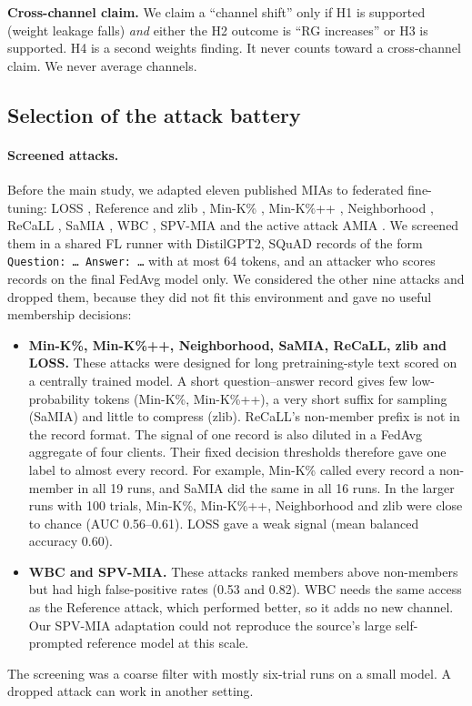 \documentclass[11pt]{article}
\begin{document}
\textbf{Cross-channel claim.} We claim a ``channel shift'' only if H1 is supported (weight leakage falls) \emph{and} either the H2 outcome is ``RG increases'' or H3 is supported. H4 is a second weights finding. It never counts toward a cross-channel claim. We never average channels.

\subsection{Selection of the attack battery}\label{sec:battery}

\paragraph{Screened attacks.} Before the main study, we adapted eleven published MIAs to federated fine-tuning: LOSS \citep{yeom2018privacy}, Reference and zlib \citep{carlini2021extracting}, Min-K\% \citep{shi2024detecting}, Min-K\%++ \citep{zhang2025minkpp}, Neighborhood \citep{mattern2023membership}, ReCaLL \citep{xie2024recall}, SaMIA \citep{kaneko2024sampling}, WBC \citep{chen2026window}, SPV-MIA \citep{fu2024membership} and the active attack AMIA \citep{nguyen2023active}. We screened them in a shared FL runner with DistilGPT2, SQuAD records of the form \texttt{Question: \ldots{} Answer: \ldots} with at most 64 tokens, and an attacker who scores records on the final FedAvg model only. We considered the other nine attacks and dropped them, because they did not fit this environment and gave no useful membership decisions:
\begin{itemize}
  \item \textbf{Min-K\%, Min-K\%++, Neighborhood, SaMIA, ReCaLL, zlib and LOSS.} These attacks were designed for long pretraining-style text scored on a centrally trained model. A short question--answer record gives few low-probability tokens (Min-K\%, Min-K\%++), a very short suffix for sampling (SaMIA) and little to compress (zlib). ReCaLL's non-member prefix is not in the record format. The signal of one record is also diluted in a FedAvg aggregate of four clients. Their fixed decision thresholds therefore gave one label to almost every record. For example, Min-K\% called every record a non-member in all 19 runs, and SaMIA did the same in all 16 runs. In the larger runs with 100 trials, Min-K\%, Min-K\%++, Neighborhood and zlib were close to chance (AUC 0.56--0.61). LOSS gave a weak signal (mean balanced accuracy 0.60).
  \item \textbf{WBC and SPV-MIA.} These attacks ranked members above non-members but had high false-positive rates (0.53 and 0.82). WBC needs the same access as the Reference attack, which performed better, so it adds no new channel. Our SPV-MIA adaptation could not reproduce the source's large self-prompted reference model at this scale.
\end{itemize}
The screening was a coarse filter with mostly six-trial runs on a small model. A dropped attack can work in another setting.
\end{document}
